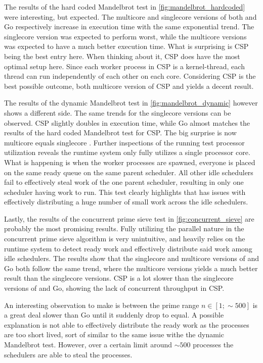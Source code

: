 The results of the hard coded Mandelbrot test in \cref{fig:mandelbrot_hardcoded} were interesting, but expected. The multicore and singlecore versions of both \Proxc{} and Go respectively increase in execution time with the same exponential trend. The singlecore version was expected to perform worst, while the multicore versions was expected to have a much better execution time. What is surprising is \Cpp{}CSP being the best entry here. When thinking about it, \Cpp{}CSP does have the most optimal setup here. Since each worker process in \Cpp{}CSP is a kernel\hyp{}thread, each thread can run independently of each other on each core. Considering \Cpp{}CSP is the best possible outcome, both multicore version of \Cpp{}CSP and \Proxc{} yields a decent result.

The results of the dynamic Mandelbrot test in \cref{fig:mandelbrot_dynamic} however shows a different side. The same trends for the singlecore versions can be observed. \Cpp{}CSP slightly doubles in execution time, while Go almost matches the results of the hard coded Mandelbrot test for \Cpp{}CSP. The big surprise is now multicore \Proxc{} equals singlecore \Proxc{}. Further inspections of the running test processor utilization reveals the runtime system only fully utilizes a single processor core. What is happening is when the worker processes are spawned, everyone is placed on the same ready queue on the same parent scheduler. All other idle schedulers fail to effectively steal work of the one parent scheduler, resulting in only one scheduler having work to run. This test clearly highlights that \Proxc{} has issues with effectively distributing a huge number of small work across the idle schedulers.

Lastly, the results of the concurrent prime sieve test in \cref{fig:concurrent_sieve} are probably the most promising results. Fully utilizing the parallel nature in the concurrent prime sieve algorithm is very unintuitive, and heavily relies on the runtime system to detect ready work and effectively distribute said work among idle schedulers. The results show that the singlecore and multicore versions of \Proxc{} and Go both follow the same trend, where the multicore versions yields a much better result than the singlecore versions. \Cpp{}CSP is a lot slower than the singlecore versions of \Proxc{} and Go, showing the lack of concurrent throughput in \Cpp{}CSP. 

An interesting observation to make is between the prime range $n\in[1;\sim{}500]$ \Proxc{} is a great deal slower than Go until it suddenly drop to equal. A possible explanation is not able to effectively distribute the ready work as the processes are too short lived, sort of similar to the same issue withe the dynamic Mandelbrot test. However, over a certain limit around $\sim{}500$ processes the schedulers are able to steal the processes.

